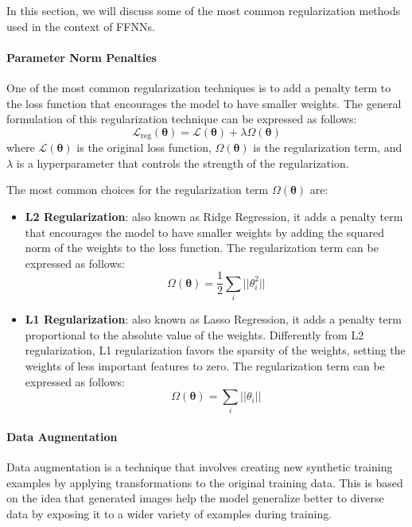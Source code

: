 In this section, we will discuss some of the most common regularization methods used in the context of FFNNs.

\paragraph{Parameter Norm Penalties}
One of the most common regularization techniques is to add a penalty term to the loss function that encourages the model to have smaller weights.
The general formulation of this regularization technique can be expressed as follows:
\begin{equation*}
    \mathcal{L}_{\text{reg}}(\boldsymbol{\theta}) = \mathcal{L}(\boldsymbol{\theta}) + \lambda \Omega(\boldsymbol{\theta})
\end{equation*}
where $\mathcal{L}(\boldsymbol{\theta})$ is the original loss function, $\Omega(\boldsymbol{\theta})$ is the regularization term, and $\lambda$
is a hyperparameter that controls the strength of the regularization.

The most common choices for the regularization term $\Omega(\boldsymbol{\theta})$ are:
\begin{itemize}
    \item \textbf{L2 Regularization}: also known as Ridge Regression, it adds a penalty term that encourages the model to have smaller weights 
    by adding the squared norm of the weights to the loss function. The regularization term can be expressed as follows:
    \begin{equation*}
        \Omega(\boldsymbol{\theta}) = \frac{1}{2} \sum_{i} ||\theta_i^2||
    \end{equation*}
    \item \textbf{L1 Regularization}: also known as Lasso Regression, it adds a penalty term proportional to the absolute value of the weights.
    Differently from L2 regularization, L1 regularization favors the sparsity of the weights, setting the weights of less important features to zero. 
    The regularization term can be expressed as follows:
    \begin{equation*}
        \Omega(\boldsymbol{\theta}) = \sum_{i} ||\theta_i||
    \end{equation*}
\end{itemize}

\paragraph{Data Augmentation}
Data augmentation is a technique that involves creating new synthetic training examples by applying transformations to the original training data.
This is based on the idea that generated images help the model generalize better to diverse data by exposing it to a wider variety of examples during training.

